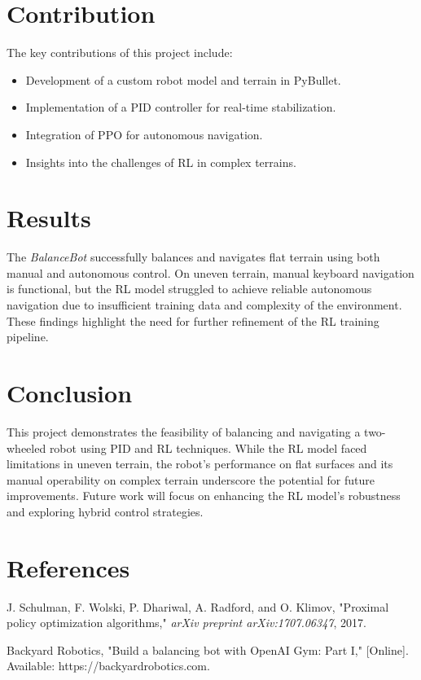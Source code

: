 \documentclass[12pt, draftclsnofoot, onecolumn]{IEEEtran}
\begin{document}
\section{Contribution}
The key contributions of this project include:
\begin{itemize}
    \item Development of a custom robot model and terrain in PyBullet.
    \item Implementation of a PID controller for real-time stabilization.
    \item Integration of PPO for autonomous navigation.
    \item Insights into the challenges of RL in complex terrains.
\end{itemize}

\section{Results}
The \textit{BalanceBot} successfully balances and navigates flat terrain using both manual and autonomous control. On uneven terrain, manual keyboard navigation is functional, but the RL model struggled to achieve reliable autonomous navigation due to insufficient training data and complexity of the environment. These findings highlight the need for further refinement of the RL training pipeline.

\section{Conclusion}
This project demonstrates the feasibility of balancing and navigating a two-wheeled robot using PID and RL techniques. While the RL model faced limitations in uneven terrain, the robot's performance on flat surfaces and its manual operability on complex terrain underscore the potential for future improvements. Future work will focus on enhancing the RL model's robustness and exploring hybrid control strategies.

\section*{References}
\begin{thebibliography}{1}
 J. Schulman, F. Wolski, P. Dhariwal, A. Radford, and O. Klimov, "Proximal policy optimization algorithms," \textit{arXiv preprint arXiv:1707.06347}, 2017.

 Backyard Robotics, "Build a balancing bot with OpenAI Gym: Part I," [Online]. Available: https://backyardrobotics.com.
\end{thebibliography}
\end{document}
